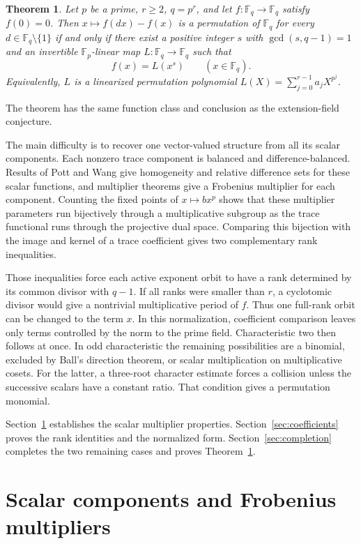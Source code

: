 \documentclass[11pt]{article}
\newtheorem{theorem}{Theorem}[section]
\theoremstyle{definition}
\theoremstyle{remark}
\newcommand{\Fp}{\mathbb F_p}
\newcommand{\Fq}{\mathbb F_q}
\numberwithin{equation}{section}
\begin{document}
\begin{theorem}\label{thm:main}
Let \(p\) be a prime, \(r\ge2\), \(q=p^r\), and let
\(f:\Fq\to\Fq\) satisfy \(f(0)=0\).
Then \(x\mapsto f(dx)-f(x)\) is a permutation of \(\Fq\) for every
\(d\in\Fq\setminus\{1\}\) if and only if there exist a positive
integer \(s\) with \(\gcd(s,q-1)=1\) and an invertible
\(\Fp\)-linear map \(L:\Fq\to\Fq\) such that
\[
 f(x)=L(x^s)\qquad(x\in\Fq).
\]
Equivalently, \(L\) is a linearized permutation polynomial
\(L(X)=\sum_{j=0}^{r-1}a_jX^{p^j}\).
\end{theorem}

The theorem has the same function class and conclusion as the
extension-field conjecture.

The main difficulty is to recover one vector-valued structure from all
its scalar components. Each nonzero trace component is balanced and
difference-balanced. Results of Pott and Wang give homogeneity and
relative difference sets for these scalar functions, and multiplier
theorems give a Frobenius multiplier for each component.
Counting the fixed points of \(x\mapsto bx^p\) shows that these
multiplier parameters run bijectively through a multiplicative subgroup
as the trace functional runs through the projective dual space.
Comparing this bijection with the image and kernel of a trace
coefficient gives two complementary rank inequalities.

Those inequalities force each active exponent orbit to have a rank
determined by its common divisor with \(q-1\).
If all ranks were smaller than \(r\), a cyclotomic divisor would give
a nontrivial multiplicative period of \(f\). Thus one full-rank orbit
can be changed to the term \(x\). In this normalization, coefficient
comparison leaves only terms controlled by the norm to the prime
field. Characteristic two then follows at once. In odd characteristic
the remaining possibilities are a binomial, excluded by Ball's
direction theorem, or scalar multiplication on multiplicative cosets.
For the latter, a three-root character estimate forces a collision
unless the successive scalars have a constant ratio. That condition
gives a permutation monomial.

Section~\ref{sec:multipliers} establishes the scalar multiplier
properties. Section~\ref{sec:coefficients} proves the rank identities
and the normalized form. Section~\ref{sec:completion} completes the
two remaining cases and proves Theorem~\ref{thm:main}.

\section{Scalar components and Frobenius multipliers}
\label{sec:multipliers}
\end{document}
